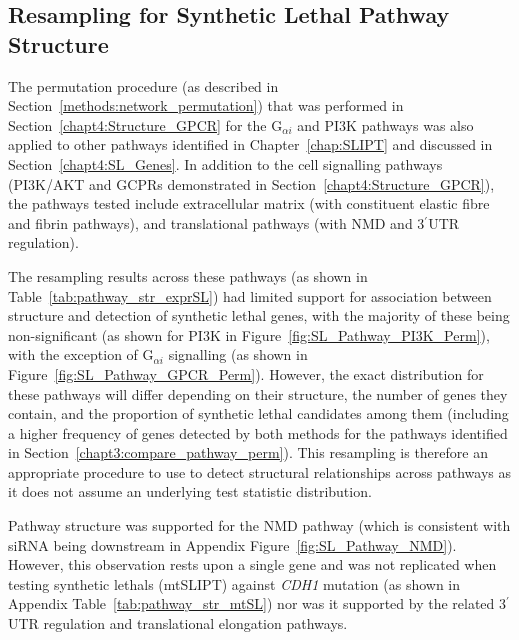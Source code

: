 \FloatBarrier

\subsection{Resampling for Synthetic Lethal Pathway Structure}  \label{chapt4:Structure_Perm}

The permutation procedure (as described in Section~\ref{methods:network_permutation}) that was performed in Section~\ref{chapt4:Structure_GPCR} for the G$_{\alpha i}$ and PI3K \glspl{pathway} was also applied to other \glspl{pathway} identified in Chapter~\ref{chap:SLIPT} and discussed in Section~\ref{chapt4:SL_Genes}. In addition to the cell signalling \glspl{pathway} (PI3K/AKT and GCPRs demonstrated in Section~\ref{chapt4:Structure_GPCR}), the \glspl{pathway} tested include extracellular matrix (with constituent elastic fibre and fibrin \glspl{pathway}), and translational \glspl{pathway} (with \gls{NMD} and 3$^\prime$\gls{UTR} regulation).

The resampling results across these \glspl{pathway} (as shown in Table~\ref{tab:pathway_str_exprSL}) had limited support for association between  structure and detection of \gls{synthetic lethal} genes, with the majority of these being non-significant (as shown for PI3K in Figure~\ref{fig:SL_Pathway_PI3K_Perm}), with the exception of G$_{\alpha i}$ signalling (as shown in Figure~\ref{fig:SL_Pathway_GPCR_Perm}). However, the exact distribution for these \glspl{pathway} will differ depending on their structure, the number of genes they contain, and the proportion of \gls{synthetic lethal} candidates among them (including a higher frequency of genes detected by both methods for the \glspl{pathway} identified in Section~\ref{chapt3:compare_pathway_perm}). This resampling is therefore an appropriate procedure to use to detect structural relationships across \glspl{pathway} as it does not assume an underlying test statistic distribution.

Pathway structure was supported for the \gls{NMD} \gls{pathway} (which is consistent with \gls{siRNA} being downstream in Appendix Figure~\ref{fig:SL_Pathway_NMD}). However, this observation rests upon a single gene and was not replicated when testing \glspl{synthetic lethal} (\acrshort{mtSLIPT}) against \textit{CDH1} \gls{mutation} (as shown in Appendix Table~\ref{tab:pathway_str_mtSL}) nor was it supported by the related 3$^\prime$\gls{UTR} regulation and translational elongation \glspl{pathway}.


